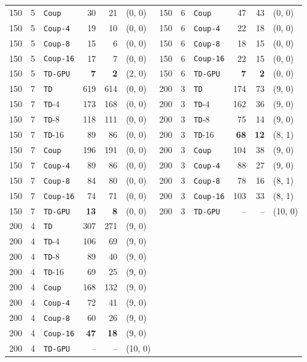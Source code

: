 \documentclass[letterpaper]{article}
\begin{document}
\begin{table}[t]
{\begin{tabular}{rrlrrl|rrlrrl}
150 & 5 & \texttt{Coup} & 30 & 21 & (0, 0) & 150 & 6 & \texttt{Coup} & 47 & 43 & (0, 0) \\
150 & 5 & \texttt{Coup-4} & 19 & 10 & (0, 0) & 150 & 6 & \texttt{Coup-4} & 22 & 18 & (0, 0) \\
150 & 5 & \texttt{Coup-8} & 15 & 6 & (0, 0) & 150 & 6 & \texttt{Coup-8} & 18 & 15 & (0, 0) \\
150 & 5 & \texttt{Coup-16} & 17 & 7 & (0, 0) & 150 & 6 & \texttt{Coup-16} & 22 & 15 & (0, 0) \\
150 & 5 & \texttt{TD-GPU} & \textbf{7} & \textbf{2} & (2, 0) & 150 & 6 & \texttt{TD-GPU} & \textbf{7} & \textbf{2} & (0, 0) \\
\midrule
150 & 7 & \texttt{TD} & 619 & 614 & (0, 0) & 200 & 3 & \texttt{TD} & 174 & 73 & (9, 0) \\
150 & 7 & \texttt{TD}-4 & 173 & 168 & (0, 0) & 200 & 3 & \texttt{TD}-4 & 162 & 36 & (9, 0) \\
150 & 7 & \texttt{TD}-8 & 118 & 111 & (0, 0) & 200 & 3 & \texttt{TD}-8 & 75 & 14 & (9, 0) \\
150 & 7 & \texttt{TD}-16 & 89 & 86 & (0, 0) & 200 & 3 & \texttt{TD}-16 & \textbf{68} & \textbf{12} & (8, 1) \\
150 & 7 & \texttt{Coup} & 196 & 191 & (0, 0) & 200 & 3 & \texttt{Coup} & 104 & 38 & (9, 0) \\
150 & 7 & \texttt{Coup-4} & 89 & 86 & (0, 0) & 200 & 3 & \texttt{Coup-4} & 88 & 27 & (9, 0) \\
150 & 7 & \texttt{Coup-8} & 84 & 80 & (0, 0) & 200 & 3 & \texttt{Coup-8} & 78 & 16 & (8, 1) \\
150 & 7 & \texttt{Coup-16} & 74 & 71 & (0, 0) & 200 & 3 & \texttt{Coup-16} & 103 & 33 & (8, 1) \\
150 & 7 & \texttt{TD-GPU} & \textbf{13} & \textbf{8} & (0, 0) & 200 & 3 & \texttt{TD-GPU} & -- & -- & (10, 0) \\
\midrule
200 & 4 & \texttt{TD} & 307 & 271 & (9, 0) &  &  &  &  &  &  \\
200 & 4 & \texttt{TD}-4 & 106 & 69 & (9, 0) &  &  &  &  &  &  \\
200 & 4 & \texttt{TD}-8 & 89 & 40 & (9, 0) &  &  &  &  &  &  \\
200 & 4 & \texttt{TD}-16 & 69 & 25 & (9, 0) &  &  &  &  &  &  \\
200 & 4 & \texttt{Coup} & 168 & 132 & (9, 0) &  &  &  &  &  &  \\
200 & 4 & \texttt{Coup-4} & 72 & 41 & (9, 0) &  &  &  &  &  &  \\
200 & 4 & \texttt{Coup-8} & 60 & 26 & (9, 0) &  &  &  &  &  &  \\
200 & 4 & \texttt{Coup-16} & \textbf{47} & \textbf{18} & (9, 0) &  &  &  &  &  &  \\
200 & 4 & \texttt{TD-GPU} & -- & -- & (10, 0) &  &  &  &  &  &  \\
\bottomrule
\end{tabular}
}
\label{tab:mospp_result}
\end{table}
\end{document}
